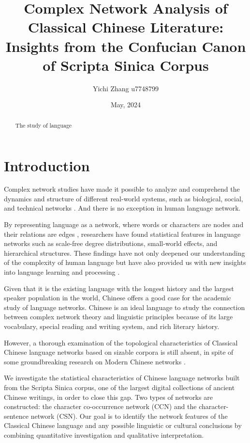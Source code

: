 \documentclass[11pt]{article}
\title{Complex Network Analysis of Classical Chinese Literature: Insights from the Confucian Canon of Scripta Sinica Corpus}
\author{Yichi Zhang u7748799}
\date{May, 2024}
\begin{document}
\maketitle

\thispagestyle{fancy}

\begin{abstract}
    The study of language 
\end{abstract}

\section{Introduction}
Complex network studies have made it possible to analyze and comprehend the dynamics and structure of different real-world systems, such as biological, social, and technical networks \cite{Albert2002,Dorogovtsev2002,Newman2003,Boccaletti2006,Costa2007}. And there is no exception in human language network. 

By representing language as a network, where words or characters are nodes and their relations are edges \cite{FerreriCancho2004,Liu2004}, researchers have found statistical features in language networks such as scale-free degree distributions, small-world effects, and hierarchical structures. These findings have not only deepened our understanding of the complexity of human language but have also provided us with new insights into language learning and processing \cite{Baronchelli2013}.

Given that it is the existing language with the longest history and the largest speaker population in the world, Chinese offers a good case for the academic study of language networks. Chinese is an ideal language to study the connection between complex network theory and linguistic principles because of its large vocabulary, special reading and writing system, and rich literary history.

However, a thorough examination of the topological characteristics of Classical Chinese language networks based on sizable corpora is still absent, in spite of some groundbreaking research on Modern Chinese networks \cite{Li2007,Liu2008}.

We investigate the statistical characteristics of Chinese language networks built from the Scripta Sinica corpus, one of the largest digital collections of ancient Chinese writings, in order to close this gap. Two types of networks are constructed: the character co-occurrence network (CCN) and the character-sentence network (CSN). Our goal is to identify the network features of the Classical Chinese language and any possible linguistic or cultural conclusions by combining quantitative investigation and qualitative interpretation.
\end{document}
